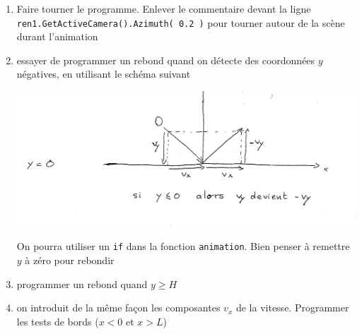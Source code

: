 \documentclass[12pt]{letter}
\begin{document}
 \begin{enumerate} 
 
    \item Faire tourner le programme. Enlever le commentaire devant la ligne
    \texttt{ren1.GetActiveCamera().Azimuth( 0.2 )} pour tourner autour de la scène durant l'animation
    \item essayer de programmer un rebond quand on détecte des coordonnées $y$ négatives, en utilisant le schéma suivant 
   \begin{center}
     \includegraphics[width=0.8\linewidth]{rebond.pdf}
   \end{center}
   On pourra utiliser un \texttt{if} dans la fonction \texttt{animation}. Bien penser à remettre $y$ à zéro pour rebondir
   \item programmer un rebond quand $y \geqslant H$
   \item on introduit de la même façon les composantes $v_x$ de la vitesse. Programmer les tests de bords ($x <0$ et $x > L$)
    
  \end{enumerate}
\end{document}
